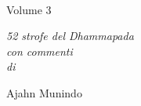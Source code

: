\cleartorecto
\thispagestyle{empty}

\vspace*{1em}

{\centering

\\[0.4\baselineskip]
Volume 3
\vspace*{3\baselineskip}

{\itshape 52 strofe del Dhammapada\\
con commenti\\
di}

\vspace*{2\baselineskip}
Ajahn Munindo

\vfill


}
